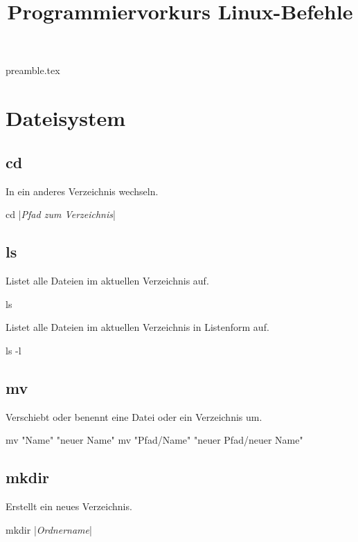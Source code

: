 \RequirePackage{import}
{preamble.tex}
\usepackage{hyperref}

\title{Programmiervorkurs Linux-Befehle}


\maketitle

\section{Dateisystem}

\subsection{cd}
In ein anderes Verzeichnis wechseln.
\begin{bashcode}
    cd |\textit{Pfad zum Verzeichnis}|
\end{bashcode}


\subsection{ls}
Listet alle Dateien im aktuellen Verzeichnis auf.
\begin{bashcode}
    ls
\end{bashcode}
Listet alle Dateien im aktuellen Verzeichnis in Listenform auf.
\begin{bashcode}
    ls -l
\end{bashcode}

\subsection{mv}
Verschiebt oder benennt eine Datei oder ein Verzeichnis um.
\begin{bashcode}
    mv "Name" "neuer Name"
    mv "Pfad/Name" "neuer Pfad/neuer Name"
\end{bashcode}

\subsection{mkdir}
Erstellt ein neues Verzeichnis.
\begin{bashcode}
    mkdir |\textit{Ordnername}|
\end{bashcode}


